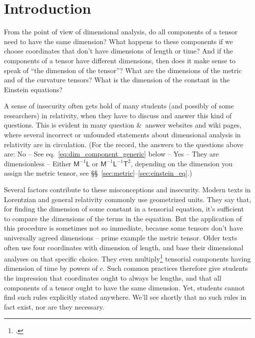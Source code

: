 \documentclass[\ifafour a4paper,12pt,\else a5paper,10pt,\fi%
onecolumn,oneside,article,%
british%
]{memoir}
\theoremstyle{remark}
\theoremstyle{innote}
\newcommand*{\citep}{\footcites}
\newcommand*{\amp}{\&}
\renewcommand*{\|}[1][]{\nonscript\,#1\vert\nonscript\;\mathopen{}}
\newcommand*{\sect}{\S}%
\newcommand*{\sects}{\S\S}%
\newcommand*{\eqn}{eq.}%
\newcommand*{\eg}{{e.g.}}
\newcommand*{\Le}{\textsf{L}}
\newcommand*{\Ti}{\textsf{T}}
\newcommand*{\Ma}{\textsf{M}}
\begin{document}

\section{Introduction}
\label{sec:intro}


From the point of view of dimensional analysis, do all components of a
tensor need to have the same dimension? What happens to these components if
we choose coordinates that don't have dimensions of length or time? And if
the components of a tensor have different dimensions, then does it make
sense to speak of \enquote{the dimension of the tensor}? What are the
dimensions of the metric and of the curvature tensors? What is the
dimension of the constant in the Einstein equations?

A sense of insecurity often gets hold of many students (and possibly of
some researchers) in relativity, when they have to discuss and answer
this kind of questions. %
This is evident in many question \amp\ answer websites and wiki pages,
where several incorrect or unfounded statements about dimensional analysis
in relativity are in circulation. (For the record, the answers to the
questions above are: No -- See \eqn~\eqref{eq:dim_component_generic} below
-- Yes -- They are dimensionless -- Either $\Ma^{-1}\Le$ or
$\Ma^{-1}\Le^{-1}\Ti^{2}$, depending on the dimension you assign the metric
tensor, see \sects~\ref{sec:metric}--\ref{sec:einstein_eq}.)

Several factors contribute to these misconceptions and insecurity. Modern
texts in Lorentzian and general relativity commonly use geometrized units.
They say that, for finding the dimension of some constant in a tensorial
equation, it's sufficient to compare the dimensions of the terms in the
equation. But the application of this procedure is sometimes not so
immediate, because some tensors don't have universally agreed dimensions --
prime example the metric tensor. Older texts often use four coordinates
with dimension of length, and base their dimensional analyses on that
specific choice. They even multiply\citep[\eg][p.~71
\eqn~(37.1)]{tolman1934_t1949}[p.~80
\eqn~(32.15)]{landauetal1939_t1996}[p.~332
\eqn~(10.15)]{adleretal1965_r1975}[\sect~5.7]{penfieldetal1967}[for an
exception see][\sect~X]{kitano2013} tensorial components having dimension
of time by powers of $c$. Such common practices therefore give students the
impression that coordinates ought to always be lengths, and that all
components of a tensor ought to have the same dimension. Yet, students
cannot find such rules explicitly stated anywhere. We'll see shortly that
no such rules in fact exist, nor are they necessary.
\end{document}
